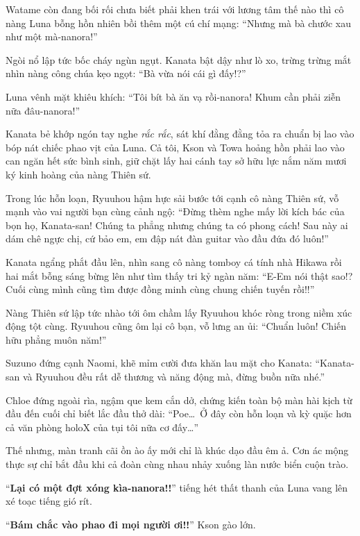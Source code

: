 \documentclass[../main.tex]{subfiles}
\begin{document}
Watame còn đang bối rối chưa biết phải khen trái với lương tâm thế nào thì cô nàng Luna bỗng hồn nhiên bồi thêm một cú chí mạng: ``Nhưng mà bà chước xau như một mà-nanora!''

Ngòi nổ lập tức bốc cháy ngùn ngụt. Kanata bật dậy như lò xo, trừng trừng mắt nhìn nàng công chúa kẹo ngọt: ``Bà vừa nói cái gì đấy!?''

Luna vênh mặt khiêu khích: ``Tôi bít bà ăn vạ rồi-nanora! Khum cần phải ziễn nữa đâu-nanora!''

Kanata bẻ khớp ngón tay nghe \textit{rắc rắc}, sát khí đằng đằng tỏa ra chuẩn bị lao vào bóp nát chiếc phao vịt của Luna. Cả tôi, Kson và Towa hoảng hồn phải lao vào can ngăn hết sức bình sinh, giữ chặt lấy hai cánh tay sở hữu lực nắm năm mươi ký kinh hoàng của nàng Thiên sứ.

Trong lúc hỗn loạn, Ryuuhou hậm hực sải bước tới cạnh cô nàng Thiên sứ, vỗ mạnh vào vai người bạn cùng cảnh ngộ: ``Đừng thèm nghe mấy lời kích bác của bọn họ, Kanata-san! Chúng ta phẳng nhưng chúng ta có phong cách! Sau này ai dám chê ngực chị, cứ bảo em, em đập nát đàn guitar vào đầu đứa đó luôn!''

Kanata ngẩng phắt đầu lên, nhìn sang cô nàng tomboy cá tính nhà Hikawa rồi hai mắt bỗng sáng bừng lên như tìm thấy tri kỷ ngàn năm: ``E-Em nói thật sao!? Cuối cùng mình cũng tìm được đồng minh cùng chung chiến tuyến rồi!!''

Nàng Thiên sứ lập tức nhào tới ôm chầm lấy Ryuuhou khóc ròng trong niềm xúc động tột cùng. Ryuuhou cũng ôm lại cô bạn, vỗ lưng an ủi: ``Chuẩn luôn! Chiến hữu phẳng muôn năm!''

Suzuno đứng cạnh Naomi, khẽ mỉm cười đưa khăn lau mặt cho Kanata: ``Kanata-san và Ryuuhou đều rất dễ thương và năng động mà, đừng buồn nữa nhé.''

Chloe đứng ngoài rìa, ngậm que kem cắn dở, chứng kiến toàn bộ màn hài kịch từ đầu đến cuối chỉ biết lắc đầu thở dài: ``Poe\dots\ Ở đây còn hỗn loạn và kỳ quặc hơn cả văn phòng holoX của tụi tôi nữa cơ đấy\dots''

Thế nhưng, màn tranh cãi ồn ào ấy mới chỉ là khúc dạo đầu êm ả. Cơn ác mộng thực sự chỉ bắt đầu khi cả đoàn cùng nhau nhảy xuống làn nước biển cuộn trào.

\ct

``\textbf{Lại có một đợt xóng kìa-nanora!!}'' tiếng hét thất thanh của Luna vang lên xé toạc tiếng gió rít.

``\textbf{Bám chắc vào phao đi mọi người ơi!!}'' Kson gào lớn.
\end{document}
